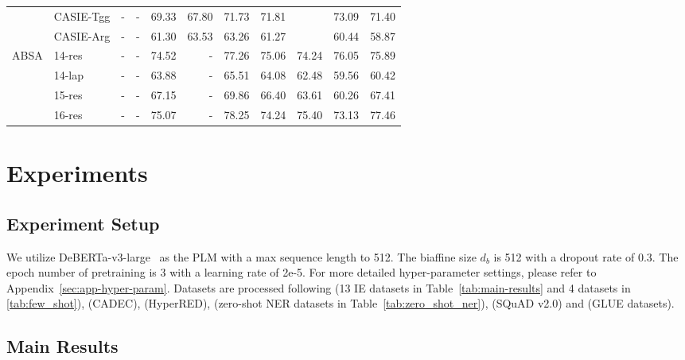 \begin{table*}[t]
{\begin{tabular}{l|l|rrrrr|rrrr}
     &
      CASIE-Tgg &
      - &
      - &
      69.33 &
      67.80 &
      71.73 &
      71.81 &
       &
      73.09 &
      71.40 \\
    &
      CASIE-Arg &
      - &
      - &
      61.30 &
      63.53 &
      63.26 &
      61.27 &
       &
      60.44 &
      58.87 \\
      \midrule
      \multirow{4}{*}{ABSA}  &
      14-res &
      - &
      - &
      74.52 &
      - &
      77.26 &
      75.06 &
      74.24 &
      76.05 &
      75.89 \\
     &
      14-lap &
      - &
      - &
      63.88 &
      - &
      65.51 &
      64.08 &
      62.48 &
      59.56 &
      60.42 \\
     &
      15-res &
      - &
      - &
      67.15 &
      - &
      69.86 &
      66.40 &
      63.61 &
      60.26 &
      67.41 \\
    &
      16-res &
      - &
      - &
      75.07 &
      - &
      78.25 &
      74.24 &
      75.40 &
      73.13 &
      77.46 \\
    \bottomrule
    \end{tabular}%
  }
  \caption{Results on single IE tasks.}
  \label{tab:main-results}
\end{table*}

\section{Experiments}

\subsection{Experiment Setup}

We utilize DeBERTa-v3-large~\cite{deberta} as the PLM with a max sequence length to 512.
The biaffine size $d_b$ is 512 with a dropout rate of 0.3.
The epoch number of pretraining is 3 with a learning rate of 2e-5.
For more detailed hyper-parameter settings, please refer to Appendix~\ref{sec:app-hyper-param}.
Datasets are processed following \citet{uie} (13 IE datasets in Table~\ref{tab:main-results} and 4 datasets in \ref{tab:few_shot}), \citet{w2ner} (CADEC), \citet{hyperred} (HyperRED), \citet{usm} (zero-shot NER datasets in Table~\ref{tab:zero_shot_ner}), \citet{squad-v2} (SQuAD v2.0) and \citet{glue} (GLUE datasets).

\subsection{Main Results}

